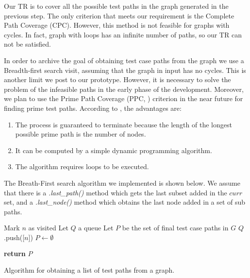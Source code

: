 Our TR is to cover all the possible test paths in the graph generated in the previous step. The only criterion that meets our requirement is the Complete Path Coverage (CPC). However, this method is not feasible for graphs with cycles\cite[p. 36]{book:introduction_to_software_testing}. In fact, graph with loops has an infinite number of paths, so our TR can not be satisfied.

In order to archive the goal of obtaining test case paths from the graph we use a Breadth-first search visit, assuming that the graph in input has no cycles. This is another limit we post to our prototype. However, it is necessary to solve the problem of the infeasible paths in the early phase of the development. Moreover, we plan to use the Prime Path Coverage (PPC, \cite[p. 36]{book:introduction_to_software_testing}) criterion in the near future for finding prime test paths. According to \cite{book:introduction_to_software_testing}, the advantages are:

\begin{enumerate}
\item The process is guaranteed to terminate because the length of the longest possible prime path is the number of nodes.
\item It can be computed by a simple dynamic programming algorithm.
\item The algorithm requires loops to be executed.
\end{enumerate}

The Breath-First search algorithm we implemented is shown below. We assume that there is a \textit{.last\_path()} method which gets the last subset added in the $curr$ set, and a \textit{.last\_node()} method which obtains the last node added in a set of sub paths.

\vspace{0.4cm}
\begin{algorithm}[H]
	Mark $n$ as visited\;
	Let $Q$ a queue\;
	Let $P$ be the set of final test case paths in $G$\;
	$Q$.push([$n$])\;
	$P \leftarrow \emptyset$\;

	\textbf{return} $P$\;
	\vspace{0.2cm}
	\caption{Algorithm for obtaining a list of test paths from a graph.}
\end{algorithm}
\vspace{0.4cm}

